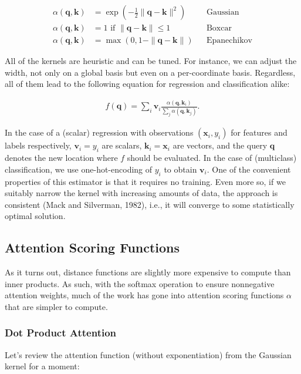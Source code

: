\documentclass[a4paper,12pt]{article}
\theoremstyle{definition}
\begin{document}
\begin{align*}
    \alpha(\mathbf{q}, \mathbf{k}) & = \exp\left(-\frac{1}{2} \|\mathbf{q} - \mathbf{k}\|^2 \right)         &  & \mathrm{Gaussian}    \\
    \alpha(\mathbf{q}, \mathbf{k}) & = 1 \text{ if } \|\mathbf{q} - \mathbf{k}\| \leq 1                     &  & \mathrm{Boxcar}      \\
    \alpha(\mathbf{q}, \mathbf{k}) & = \mathop{\mathrm{max}}\left(0, 1 - \|\mathbf{q} - \mathbf{k}\|\right) &  & \mathrm{Epanechikov}
\end{align*}

All of the kernels are heuristic and can be tuned. For instance, we can adjust the width, not only on a global basis but even on a per-coordinate basis. Regardless, all of them lead to the following
equation for regression and classification alike:

\begin{align*}
    f(\mathbf{q}) = \sum_i \mathbf{v}_i \frac{\alpha(\mathbf{q}, \mathbf{k}_i)}{\sum_j \alpha(\mathbf{q}, \mathbf{k}_j)}.
\end{align*}

In the case of a (scalar) regression with observations $(\mathbf{x}_i, y_i)$ for features and labels respectively, $\mathbf{v}_i = y_i$ are scalars, $\mathbf{k}_i = \mathbf{x}_i$ are vectors, and
the query $\mathbf{q}$ denotes the new location where $f$ should be evaluated. In the case of (multiclass) classification, we use one-hot-encoding of $y_i$ to obtain $\mathbf{v}_i$.
One of the convenient properties of this estimator is that it requires no training. Even more so, if we suitably narrow the kernel with increasing amounts of data, the approach is consistent (Mack and Silverman, 1982),
i.e., it will converge to some statistically optimal solution.
\subsection*{Attention Scoring Functions}
As it turns out, distance functions are slightly more expensive to compute than inner products. As such, with the softmax operation to ensure nonnegative attention weights,
much of the work has gone into attention scoring functions $\alpha$ that are simpler to compute.
\subsubsection*{Dot Product Attention}
Let's review the attention function (without exponentiation) from the Gaussian kernel for a moment:
\end{document}
